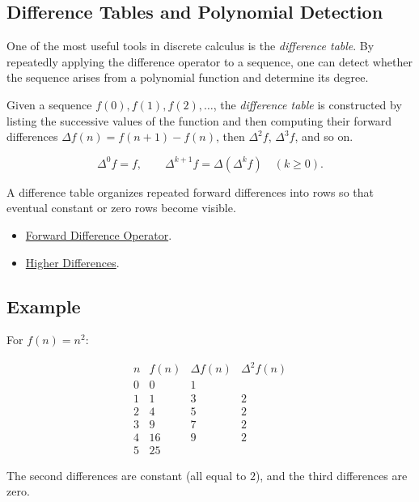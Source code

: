 \subsection{Difference Tables and Polynomial Detection}
\label{subsec:difference-tables}

\begin{exposition}
One of the most useful tools in discrete calculus is the \emph{difference
table}. By repeatedly applying the difference operator to a sequence,
one can detect whether the sequence arises from a polynomial function and
determine its degree.
\end{exposition}

\begin{definition}
\label{def:difference-table}
Given a sequence \(f(0), f(1), f(2), \dots\), the \emph{difference table}
is constructed by listing the successive values of the function and then
computing their forward differences \(\Delta f(n) = f(n+1)-f(n)\),
then \(\Delta^2 f\), \(\Delta^3 f\), and so on.
\end{definition}

\begin{remark*}
\[
\Delta^0 f=f,\qquad
\Delta^{k+1}f=\Delta(\Delta^k f)\quad(k\ge 0).
\]
\end{remark*}

\begin{remark*}[Interpretation]
A difference table organizes repeated forward differences into rows so that
eventual constant or zero rows become visible.
\end{remark*}

\begin{dependencies}
\begin{itemize}
  \item \hyperref[def:forward-difference]{Forward Difference Operator}.
  \item \hyperref[def:higher-differences]{Higher Differences}.
\end{itemize}
\end{dependencies}

\subsection*{Example}

\begin{example*}
For \(f(n) = n^2\):

\[
\begin{array}{c|c|c|c}
n & f(n) & \Delta f(n) & \Delta^2 f(n) \\
\hline
0 & 0  & 1 &   \\
1 & 1  & 3 & 2 \\
2 & 4  & 5 & 2 \\
3 & 9  & 7 & 2 \\
4 & 16 & 9 & 2 \\
5 & 25 &   &
\end{array}
\]

The second differences are constant (all equal to \(2\)), and the third
differences are zero.
\end{example*}

